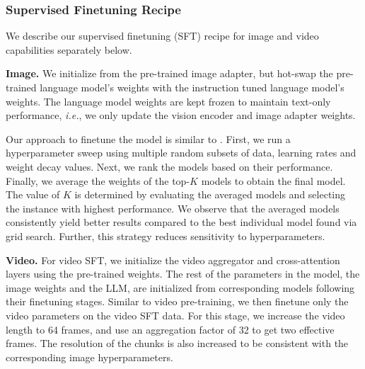 \documentclass[dvipsnames]{fairmeta}
\begin{document}
\subsubsection{Supervised Finetuning Recipe}
We describe our supervised finetuning (SFT) recipe for image and video capabilities separately below.

\label{subsubsection:vision_supervised_finetuning_recipe}
\textbf{Image.} We initialize from the pre-trained image adapter, but hot-swap the pre-trained language model's weights with the instruction tuned language model's weights. The language model weights are kept frozen to maintain text-only performance, \textit{i.e.}, we only update the vision encoder and image adapter weights.

Our approach to finetune the model is similar to \cite{wortsman2022modelsoupsaveragingweights}. First, we run a hyperparameter sweep using multiple random subsets of data, learning rates and weight decay values. Next, we rank the models based on their performance. Finally, we average the weights of the top-$K$ models to obtain the final model. The value of $K$ is determined by evaluating the averaged models and selecting the instance with highest performance. We observe that the averaged models consistently yield better results compared to the best individual model found via grid search. Further, this strategy reduces sensitivity to hyperparameters.

\textbf{Video.} For video SFT, we initialize the video aggregator and cross-attention layers using the pre-trained weights.
The rest of the parameters in the model, the image weights and the LLM, are initialized from corresponding models following their finetuning stages.
Similar to video pre-training, we then finetune only the video parameters on the video SFT data.
For this stage, we increase the video length to 64 frames, and use an aggregation factor of 32 to get two effective frames.
The resolution of the chunks is also increased to be consistent with the corresponding image hyperparameters.
\end{document}
